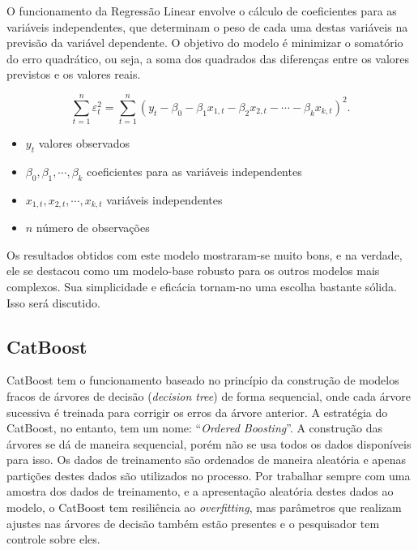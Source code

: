 O funcionamento da Regressão Linear envolve o cálculo de coeficientes para as variáveis independentes, que determinam o peso de cada uma destas variáveis na previsão da variável dependente. O objetivo do modelo é minimizar o somatório do erro quadrático, ou seja, a soma dos quadrados das diferenças entre os valores previstos e os valores reais.\cite{hyndman_fpp3_2024c}

\begin{equation}
	\sum_{t=1}^n \varepsilon_t^2 = \sum_{t=1}^n (y_t -
	\beta_{0} - \beta_{1} x_{1,t} - \beta_{2} x_{2,t} - \cdots - \beta_{k} x_{k,t})^2.
\end{equation}
\begin{itemize}
	\item $y_t$ valores observados
	\item $\beta_{0} , \beta_{1} , \cdots , \beta_{k}$ coeficientes para as variáveis independentes
	\item $x_{1,t} , x_{2,t} , \cdots , x_{k,t}$ variáveis independentes
	\item $n$ número de observações
\end{itemize}

Os resultados obtidos com este modelo mostraram-se muito bons, e na verdade, ele se destacou como um modelo-base robusto para os outros modelos mais complexos. Sua simplicidade e eficácia tornam-no uma escolha bastante sólida. Isso será discutido.

\subsection{CatBoost}

CatBoost tem o funcionamento baseado no princípio da construção de modelos fracos de árvores de decisão (\textit{decision tree}) de forma sequencial, onde cada árvore sucessiva é treinada para corrigir os erros da árvore anterior. A estratégia do CatBoost, no entanto, tem um nome: ``\textit{Ordered Boosting}''. A construção das árvores se dá de maneira sequencial, porém não se usa todos os dados disponíveis para isso. Os dados de treinamento são ordenados de maneira aleatória e apenas partições destes dados são utilizados no processo. Por trabalhar sempre com uma amostra dos dados de treinamento, e a apresentação aleatória destes dados ao modelo, o CatBoost tem resiliência ao \textit{overfitting}, mas parâmetros que realizam ajustes nas árvores de decisão também estão presentes e o pesquisador tem controle sobre eles.\cite{catboost_docs}\cite{dorogush2018catboost}\cite{prokhorenkova2018catboost}

